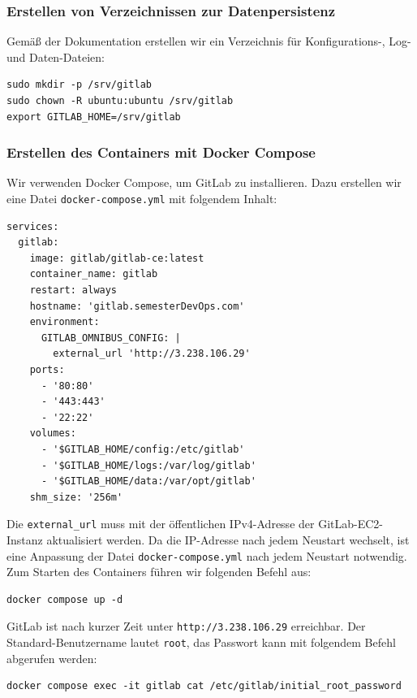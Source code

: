 \documentclass[a4paper,12pt]{article}
\begin{document}
\subsubsection{Erstellen von Verzeichnissen zur Datenpersistenz}
Gemäß der Dokumentation erstellen wir ein Verzeichnis für Konfigurations-, Log- und Daten-Dateien:

\begin{verbatim}
sudo mkdir -p /srv/gitlab
sudo chown -R ubuntu:ubuntu /srv/gitlab
export GITLAB_HOME=/srv/gitlab
\end{verbatim}

\newpage

\subsubsection{Erstellen des Containers mit Docker Compose}
Wir verwenden Docker Compose, um GitLab zu installieren. Dazu erstellen wir eine Datei \texttt{docker-compose.yml} mit folgendem Inhalt:

\begin{verbatim}
services:
  gitlab:
    image: gitlab/gitlab-ce:latest
    container_name: gitlab
    restart: always
    hostname: 'gitlab.semesterDevOps.com'
    environment:
      GITLAB_OMNIBUS_CONFIG: |
        external_url 'http://3.238.106.29'
    ports:
      - '80:80'
      - '443:443'
      - '22:22'
    volumes:
      - '$GITLAB_HOME/config:/etc/gitlab'
      - '$GITLAB_HOME/logs:/var/log/gitlab'
      - '$GITLAB_HOME/data:/var/opt/gitlab'
    shm_size: '256m'
\end{verbatim}

Die \texttt{external\_url} muss mit der öffentlichen IPv4-Adresse der GitLab-EC2-Instanz aktualisiert werden. Da die IP-Adresse nach jedem Neustart wechselt, ist eine Anpassung der Datei \texttt{docker-compose.yml} nach jedem Neustart notwendig.
Zum Starten des Containers führen wir folgenden Befehl aus:

\begin{verbatim}
docker compose up -d
\end{verbatim}

GitLab ist nach kurzer Zeit unter \texttt{http://3.238.106.29} erreichbar. Der Standard-Benutzername lautet \texttt{root}, das Passwort kann mit folgendem Befehl abgerufen werden:

\begin{verbatim}
docker compose exec -it gitlab cat /etc/gitlab/initial_root_password
\end{verbatim}


\newpage
{}
\listoffigures
\newpage
{}
\listoftables
\end{document}
